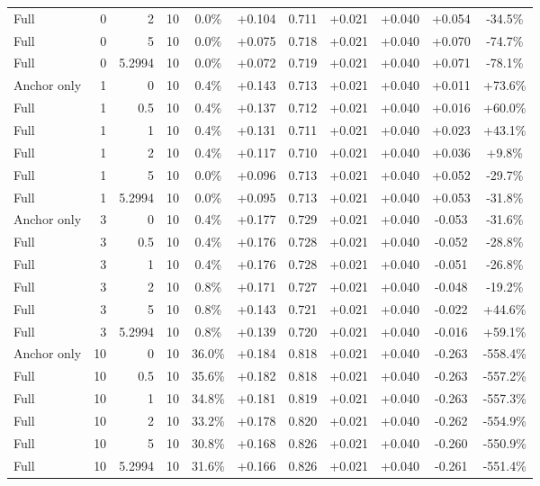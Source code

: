 \begin{table}[htbp]
\begin{tabular}{lrrrccccccc}
Full & 0 & 2 & 10 & 0.0\% & +0.104 & 0.711 & +0.021 & +0.040 & +0.054 & -34.5\% \\
Full & 0 & 5 & 10 & 0.0\% & +0.075 & 0.718 & +0.021 & +0.040 & +0.070 & -74.7\% \\
Full & 0 & 5.2994 & 10 & 0.0\% & +0.072 & 0.719 & +0.021 & +0.040 & +0.071 & -78.1\% \\
Anchor only & 1 & 0 & 10 & 0.4\% & +0.143 & 0.713 & +0.021 & +0.040 & +0.011 & +73.6\% \\
Full & 1 & 0.5 & 10 & 0.4\% & +0.137 & 0.712 & +0.021 & +0.040 & +0.016 & +60.0\% \\
Full & 1 & 1 & 10 & 0.4\% & +0.131 & 0.711 & +0.021 & +0.040 & +0.023 & +43.1\% \\
Full & 1 & 2 & 10 & 0.4\% & +0.117 & 0.710 & +0.021 & +0.040 & +0.036 & +9.8\% \\
Full & 1 & 5 & 10 & 0.0\% & +0.096 & 0.713 & +0.021 & +0.040 & +0.052 & -29.7\% \\
Full & 1 & 5.2994 & 10 & 0.0\% & +0.095 & 0.713 & +0.021 & +0.040 & +0.053 & -31.8\% \\
Anchor only & 3 & 0 & 10 & 0.4\% & +0.177 & 0.729 & +0.021 & +0.040 & -0.053 & -31.6\% \\
Full & 3 & 0.5 & 10 & 0.4\% & +0.176 & 0.728 & +0.021 & +0.040 & -0.052 & -28.8\% \\
Full & 3 & 1 & 10 & 0.4\% & +0.176 & 0.728 & +0.021 & +0.040 & -0.051 & -26.8\% \\
Full & 3 & 2 & 10 & 0.8\% & +0.171 & 0.727 & +0.021 & +0.040 & -0.048 & -19.2\% \\
Full & 3 & 5 & 10 & 0.8\% & +0.143 & 0.721 & +0.021 & +0.040 & -0.022 & +44.6\% \\
Full & 3 & 5.2994 & 10 & 0.8\% & +0.139 & 0.720 & +0.021 & +0.040 & -0.016 & +59.1\% \\
Anchor only & 10 & 0 & 10 & 36.0\% & +0.184 & 0.818 & +0.021 & +0.040 & -0.263 & -558.4\% \\
Full & 10 & 0.5 & 10 & 35.6\% & +0.182 & 0.818 & +0.021 & +0.040 & -0.263 & -557.2\% \\
Full & 10 & 1 & 10 & 34.8\% & +0.181 & 0.819 & +0.021 & +0.040 & -0.263 & -557.3\% \\
Full & 10 & 2 & 10 & 33.2\% & +0.178 & 0.820 & +0.021 & +0.040 & -0.262 & -554.9\% \\
Full & 10 & 5 & 10 & 30.8\% & +0.168 & 0.826 & +0.021 & +0.040 & -0.260 & -550.9\% \\
Full & 10 & 5.2994 & 10 & 31.6\% & +0.166 & 0.826 & +0.021 & +0.040 & -0.261 & -551.4\% \\

\end{tabular}
\end{table}
